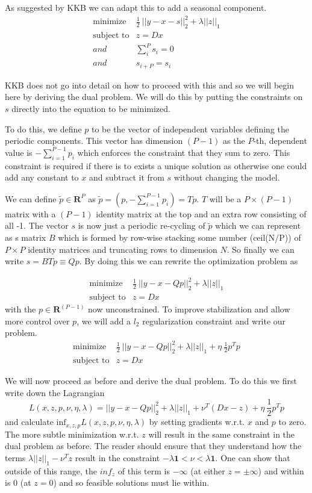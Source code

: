 \documentclass{article}
\begin{document}
As suggested by KKB we can adapt this to add a seasonal component.
\begin{eqnarray}
\mbox{minimize} & \frac{1}{2} ~ || y - x -s||_2^2  + \lambda ||z||_1 \\
\mbox{subject to} & z = D x \\
and & \sum_i^P s_i = 0\\
and & s_{i+P} = s_i
\end{eqnarray}

KKB does not go into detail on how to proceed with this and so we will begin here by deriving
the dual problem. We will do this by putting the constraints on $s$ directly into the
equation to be minimized.

To do this, we define $p$ to be the vector of independent variables defining the periodic components.
This vector has dimension $(P-1)$ as the $P$-th, dependent value is $-\sum_{i=1}^{P-1} p_i$ which enforces the constraint that
they sum to zero. This constraint is required if there is to exists a unique solution as otherwise one could add
any constant to $x$ and subtract it from $s$ without changing the model.

We can define $\tilde{p} \in \mathbf{R}^{P}$ as $\tilde{p} = \left( p,-\sum_{i=1}^{P-1} p_i \right) = T p$.
$T$ will be a $P \times (P-1)$ matrix with a $(P-1)$ identity matrix at the top and an extra row consisting of all -1.
The vector $s$ is now just a periodic re-cycling of $\tilde{p}$ which we can represent as s matrix $B$ which is formed by
row-wise stacking some number (ceil(N/P)) of $P \times P$ identity matrices and truncating rows to dimension $N$. So finally
we can write $s = B T p \equiv Q p$. By doing this we can rewrite the optimization problem as

\begin{eqnarray}
\mbox{minimize} & \frac{1}{2} ~ || y - x - Q p||_2^2  + \lambda ||z||_1 \\
\mbox{subject to} & z = D x
\end{eqnarray}
with the $p \in \mathbf{R}^{(P-1)}$ now unconstrained. To improve stabilization and allow more control over $p$, we will add
a $l_2$ regularization constraint and write our problem.
\begin{eqnarray}
\mbox{minimize} & \frac{1}{2} ~ || y - x - Q p||_2^2  + \lambda ||z||_1 + \eta ~ \frac{1}{2} p^Tp\\
\mbox{subject to} & z = D x
\end{eqnarray}

We will now proceed as before and derive the dual problem. To do this we first
write down the Lagrangian
\[
L(x,z,p,\nu,\eta,\lambda) =  || y - x - Q p||_2^2  + \lambda ||z||_1 + \nu^T (D x -z) + \eta ~ \frac{1}{2} p^Tp
\]
and calculate $\mbox{inf}_{x,z,p} L(x,z,p,\nu,\eta,\lambda)$ by setting gradients w.r.t. $x$ and $p$ to zero. The
more subtle minimization w.r.t. $z$ will result in the same constraint in the dual problem as before. The reader
should ensure that they understand how the terms $\lambda ||z||_1 - \nu^T z$ result in the constraint
$- \lambda \mathbf{1} < \nu < \lambda \mathbf{1}$. One can show that outside of this range, the $inf_z$ of this term
is $-\infty$ (at either $z = \pm \infty$) and within is 0 (at $z=0$) and so feasible solutions must lie within.
\end{document}
